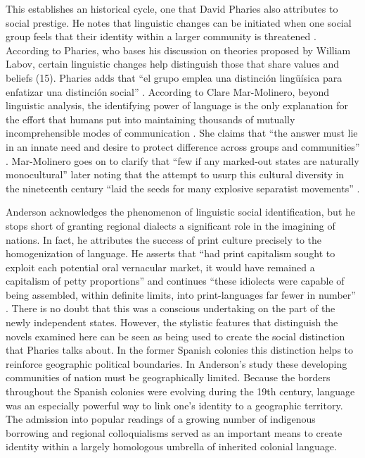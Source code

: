 \documentclass[12pt]{report}
\begin{document}
This establishes an historical cycle, one that David Pharies also attributes to social prestige.
He notes that linguistic changes can be initiated when one social group feels that their identity within a larger community is threatened \cite[15]{Davies2007}.
According to Pharies, who bases his discussion on theories proposed by William Labov, certain linguistic changes help distinguish those that share values and beliefs (15)\nocite{Pharies2007}.
Pharies adds that \enquote{el grupo emplea una distinción lingüísica para enfatizar una distinción social} \cite[17]{Pharies2007}.
According to Clare Mar-Molinero, beyond linguistic analysis, the identifying power of language is the only explanation for the effort that humans put into maintaining thousands of mutually incomprehensible modes of communication \cite[2]{Molinero2005}.
She claims that \enquote{the answer must lie in an innate need and desire to protect difference across groups and communities} \cite[2]{Molinero2005}.
Mar-Molinero goes on to clarify that \enquote{few if any marked-out states are naturally monocultural} later noting that the attempt to usurp this cultural diversity in the nineteenth century \enquote{laid the seeds for many explosive separatist movements} \cite[10]{Molinero2005}.


Anderson acknowledges the phenomenon of linguistic social identification, but he stops short of granting regional dialects a significant role in the imagining of nations.
In fact, he attributes the success of print culture precisely to the homogenization of language.
He asserts that \enquote{had print capitalism sought to exploit each potential oral vernacular market, it would have remained a capitalism of petty proportions} and continues \enquote{these idiolects were capable of being assembled, within definite limits, into print-languages far fewer in number} \cite[43]{Anderson2006}.
There is no doubt that this was a conscious undertaking on the part of the newly independent states.
However, the stylistic features that distinguish the novels examined here can be seen as being used to create the social distinction that Pharies talks about.
In the former Spanish colonies this distinction helps to reinforce geographic political boundaries.
In Anderson's study these developing communities of nation must be geographically limited.
Because the borders throughout the Spanish colonies were evolving during the 19th century, language was an especially powerful way to link one's identity to a geographic territory.
The admission into popular readings of a growing number of indigenous borrowing and regional colloquialisms served as an important means to create identity within a largely homologous umbrella of inherited colonial language.
\end{document}
